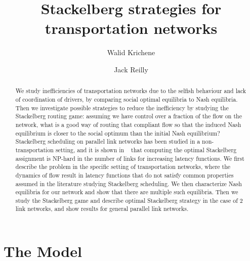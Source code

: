 

\usepackage{amsmath}
\usepackage{amsfonts}
\usepackage[utf8]{inputenc}
\usepackage{graphicx}
\usepackage{hyperref}


\title{Stackelberg strategies for transportation networks}
\author{Walid Krichene \and Jack Reilly}
\date{
}



\maketitle


\begin{abstract}
We study inefficiencies of transportation networks due to the selfish behaviour and lack of coordination of drivers, by comparing social optimal equilibria to Nash equilibria. Then we investigate possible strategies to reduce the inefficiency by studying the Stackelberg routing game: assuming we have control over a fraction of the flow on the network, what is a good way of routing that compliant flow so that the induced Nash equilibrium is closer to the social optimum than the initial Nash equilibrium? Stackelberg scheduling on parallel link networks has been studied in a non-transportation setting, and it is shown in ~\cite{rou01} that computing the optimal Stackelberg assignment is NP-hard in the number of links for increasing latency functions.
We first describe the problem in the specific setting of transportation networks, where the dynamics of flow result in latency functions that do not satisfy common properties assumed in the literature studying Stackelberg scheduling. We then characterize Nash equilibria for our network and show that there are multiple such equilibria. Then we study the Stackelberg game and describe optimal Stackelberg strategy in the case of 2 link networks, and show results for general parallel link networks.
\end{abstract}


\section{The Model}

